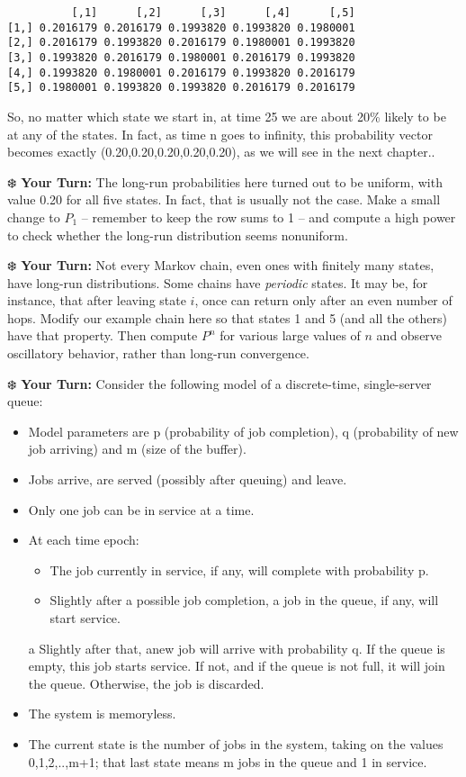 \documentclass[
  letterpaper,
  DIV=11,
  numbers=noendperiod,
  oneside]{scrreprt}
\begin{document}
\begin{verbatim}
          [,1]      [,2]      [,3]      [,4]      [,5]
[1,] 0.2016179 0.2016179 0.1993820 0.1993820 0.1980001
[2,] 0.2016179 0.1993820 0.2016179 0.1980001 0.1993820
[3,] 0.1993820 0.2016179 0.1980001 0.2016179 0.1993820
[4,] 0.1993820 0.1980001 0.2016179 0.1993820 0.2016179
[5,] 0.1980001 0.1993820 0.1993820 0.2016179 0.2016179
\end{verbatim}

So, no matter which state we start in, at time 25 we are about 20\%
likely to be at any of the states. In fact, as time n goes to infinity,
this probability vector becomes exactly (0.20,0.20,0.20,0.20,0.20), as
we will see in the next chapter..

❄️ \textbf{Your Turn:} The long-run probabilities here turned out to be
uniform, with value 0.20 for all five states. In fact, that is usually
not the case. Make a small change to \(P_1\) -- remember to keep the row
sums to 1 -- and compute a high power to check whether the long-run
distribution seems nonuniform.

❄️ \textbf{Your Turn:} Not every Markov chain, even ones with finitely
many states, have long-run distributions. Some chains have
\emph{periodic} states. It may be, for instance, that after leaving
state \(i\), once can return only after an even number of hops. Modify
our example chain here so that states 1 and 5 (and all the others) have
that property. Then compute \(P^n\) for various large values of \(n\)
and observe oscillatory behavior, rather than long-run convergence.

❄️ \textbf{Your Turn:} Consider the following model of a discrete-time,
single-server queue:

\begin{itemize}
\item
  Model parameters are p (probability of job completion), q (probability
  of new job arriving) and m (size of the buffer).
\item
  Jobs arrive, are served (possibly after queuing) and leave.
\item
  Only one job can be in service at a time.
\item
  At each time epoch:

  \begin{itemize}
  \item
    The job currently in service, if any, will complete with probability
    p.
  \item
    Slightly after a possible job completion, a job in the queue, if
    any, will start service.
  \end{itemize}

  a Slightly after that, anew job will arrive with probability q. If the
  queue is empty, this job starts service. If not, and if the queue is
  not full, it will join the queue. Otherwise, the job is discarded.
\item
  The system is memoryless.
\item
  The current state is the number of jobs in the system, taking on the
  values 0,1,2,..,m+1; that last state means m jobs in the queue and 1
  in service.
\end{itemize}
\end{document}
